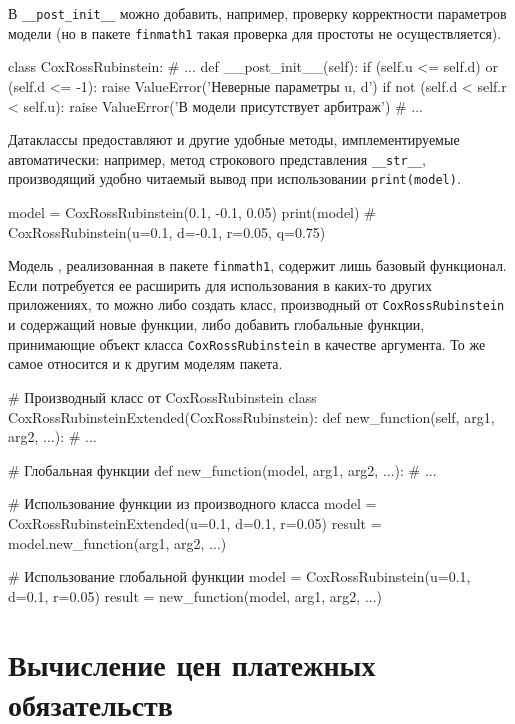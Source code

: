 В \verb"__post_init__" можно добавить, например, проверку корректности параметров модели (но в пакете \verb"finmath1" такая проверка для простоты не осуществляется).
\begin{python}
class CoxRossRubinstein:
    # ...
    def __post_init__(self):
        if (self.u <= self.d) or (self.d <= -1):
            raise ValueError('Неверные параметры u, d')
        if not (self.d < self.r < self.u):
            raise ValueError('В модели присутствует арбитраж')
        # ...
\end{python}

Датаклассы предоставляют и другие удобные методы, имплементируемые автоматически: например, метод строкового представления \verb"__str__", производящий удобно читаемый вывод при использовании \verb"print(model)". 
\begin{python}
model = CoxRossRubinstein(0.1, -0.1, 0.05)
print(model)  # CoxRossRubinstein(u=0.1, d=-0.1, r=0.05, q=0.75)
\end{python}

\begin{remark}
Модель \crr, реализованная в пакете \verb"finmath1", содержит лишь базовый функционал.
Если потребуется ее расширить для использования в каких-то других приложениях, то можно либо создать класс, производный от \verb"CoxRossRubinstein" и содержащий новые функции, либо добавить глобальные функции, принимающие объект класса \verb"CoxRossRubinstein" в качестве аргумента.
То же самое относится и к другим моделям пакета. 
\begin{python}
# Производный класс от CoxRossRubinstein
class CoxRossRubinsteinExtended(CoxRossRubinstein):
    def new_function(self, arg1, arg2, ...):
    # ...

# Глобальная функции
def new_function(model, arg1, arg2, ...):
    # ...

# Использование функции из производного класса
model = CoxRossRubinsteinExtended(u=0.1, d=0.1, r=0.05)
result = model.new_function(arg1, arg2, ...)

# Использование глобальной функции
model = CoxRossRubinstein(u=0.1, d=0.1, r=0.05)
result = new_function(model, arg1, arg2, ...)
\end{python}
\end{remark}


\section{Вычисление цен платежных обязательств}
